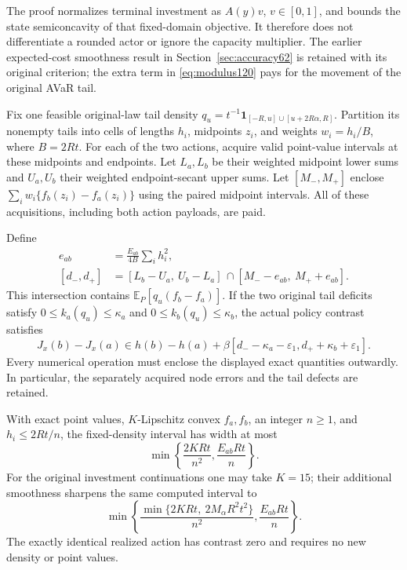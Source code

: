 The proof normalizes terminal investment as $A(y)v$, $v\in[0,1]$,
and bounds the state semiconcavity of that fixed-domain objective.
It therefore does not differentiate a rounded actor or ignore the
capacity multiplier.  The earlier expected-cost smoothness result in
Section~\ref{sec:accuracy62} is retained with its original criterion;
the extra term in \eqref{eq:modulus120} pays for the movement of the
original AVaR tail.

Fix one feasible original-law tail density
$q_u=t^{-1}\boldsymbol1_{[-R,u]\cup[u+2R\alpha,R]}$.
Partition its nonempty tails into cells of lengths $h_i$, midpoints
$z_i$, and weights $w_i=h_i/B$, where $B=2Rt$.
For each of the two actions, acquire valid point-value intervals at
these midpoints and endpoints.  Let $L_a,L_b$ be their weighted
midpoint lower sums and $U_a,U_b$ their weighted endpoint-secant
upper sums.  Let $[M_-,M_+]$ enclose
$\sum_iw_i\{f_b(z_i)-f_a(z_i)\}$ using the paired midpoint intervals.
All of these acquisitions, including both action payloads, are paid.

\begin{theorem}
\label{thm:paired120}
Define
\begin{align}
 e_{ab}&=\frac{E_{ab}}{4B}\sum_i h_i^2,\label{eq:pairradius120}\\
 [d_-,d_+]&=[L_b-U_a,\ U_b-L_a]\,
                  \cap[M_--e_{ab},\ M_++e_{ab}].
 \label{eq:pairintersection120}
\end{align}
This intersection contains $\mathbb E_P[q_u(f_b-f_a)]$.
If the two original tail deficits satisfy
$0\le k_a(q_u)\le\kappa_a$ and
$0\le k_b(q_u)\le\kappa_b$, the actual policy contrast satisfies
\begin{equation}\label{eq:policycontrast120}
 J_x(b)-J_x(a)\in h(b)-h(a)
       +\beta[d_--\kappa_a-\varepsilon_1,
                     d_++\kappa_b+\varepsilon_1].
\end{equation}
Every numerical operation must enclose the displayed exact quantities
outwardly.  In particular, the separately acquired node errors and
the tail defects are retained.

With exact point values, $K$-Lipschitz convex $f_a,f_b$, an
integer $n\ge1$, and $h_i\le2Rt/n$, the fixed-density interval
has width at most
\begin{equation}\label{eq:mixedwidth120}
 \min\left\{\frac{2KRt}{n^2},
                   \frac{E_{ab}Rt}{n}\right\}.
\end{equation}
For the original investment continuations one may take $K=15$;
their additional smoothness sharpens the same computed interval to
\begin{equation}\label{eq:smoothpairwidth120}
 \min\left\{
   \frac{\min\{2KRt,\ 2M_\alpha R^2t^2\}}{n^2},
   \frac{E_{ab}Rt}{n}\right\}.
\end{equation}
The exactly identical realized action has contrast zero and requires
no new density or point values.
\end{theorem}


